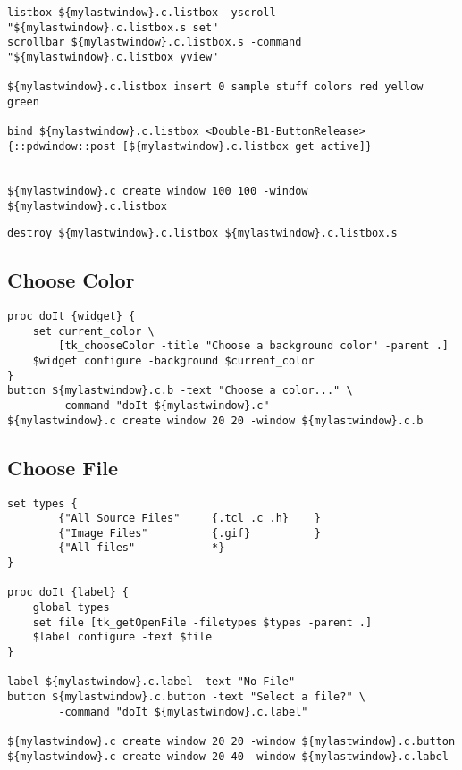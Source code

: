 \begin{lstlisting}
listbox ${mylastwindow}.c.listbox -yscroll "${mylastwindow}.c.listbox.s set"
scrollbar ${mylastwindow}.c.listbox.s -command "${mylastwindow}.c.listbox yview"

${mylastwindow}.c.listbox insert 0 sample stuff colors red yellow green

bind ${mylastwindow}.c.listbox <Double-B1-ButtonRelease> {::pdwindow::post [${mylastwindow}.c.listbox get active]}


${mylastwindow}.c create window 100 100 -window ${mylastwindow}.c.listbox
\end{lstlisting}


\begin{lstlisting}
destroy ${mylastwindow}.c.listbox ${mylastwindow}.c.listbox.s
\end{lstlisting}

\subsection{Choose Color}

\begin{lstlisting}
proc doIt {widget} {
    set current_color \
        [tk_chooseColor -title "Choose a background color" -parent .]
    $widget configure -background $current_color
}
button ${mylastwindow}.c.b -text "Choose a color..." \
        -command "doIt ${mylastwindow}.c"
${mylastwindow}.c create window 20 20 -window ${mylastwindow}.c.b
\end{lstlisting}

\subsection{Choose File}

\begin{lstlisting}
set types {
        {"All Source Files"     {.tcl .c .h}    }
        {"Image Files"          {.gif}          }
        {"All files"            *}
}

proc doIt {label} {
    global types   
    set file [tk_getOpenFile -filetypes $types -parent .]
    $label configure -text $file
}

label ${mylastwindow}.c.label -text "No File"
button ${mylastwindow}.c.button -text "Select a file?" \
        -command "doIt ${mylastwindow}.c.label"

${mylastwindow}.c create window 20 20 -window ${mylastwindow}.c.button
${mylastwindow}.c create window 20 40 -window ${mylastwindow}.c.label
\end{lstlisting}

